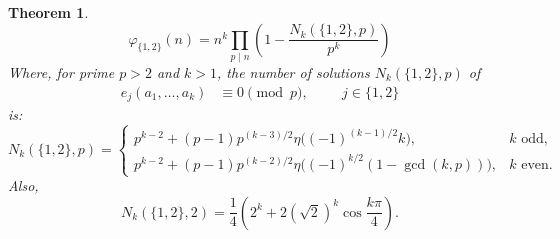 \documentclass[12pt]{article}
\newtheorem{thm}{Theorem}[subsection]%
\begin{document}
\begin{thm}\label{thm: e1,e2}
     \[
    \varphi_{\{1,2\}}(n)=n^k\prod_{p\mid n}\left(1-\frac{N_k(\{1,2\},p)}{p^k}\right)
    \]
    Where, for prime $p>2$ and $k>1$, the number of solutions $N_k(\{1,2\},p)$ of
    \begin{align*}
        e_j(a_1,\dots, a_k)&\equiv 0\pmod{p}, \hspace{1cm}j\in \{1,2\}
    \end{align*}
    is:
    $$
    N_k(\{1,2\},p)=\begin{cases}
       p^{k-2}+(p-1)p^{(k-3)/2}\eta\bigl((-1)^{(k-1)/2}k\bigr), &k\text{ odd},\\
       p^{k-2}+(p-1)p^{(k-2)/2}\eta\bigl((-1)^{k/2}(1-\gcd(k,p))\bigr), &k\text{ even}.
    \end{cases}
    $$
    Also,
    $$
    N_k(\{1,2\},2)=\frac{1}{4}\left(2^k+2(\sqrt{2})^k\cos\frac{k\pi}{4}\right).
    $$
\end{thm}
\end{document}
